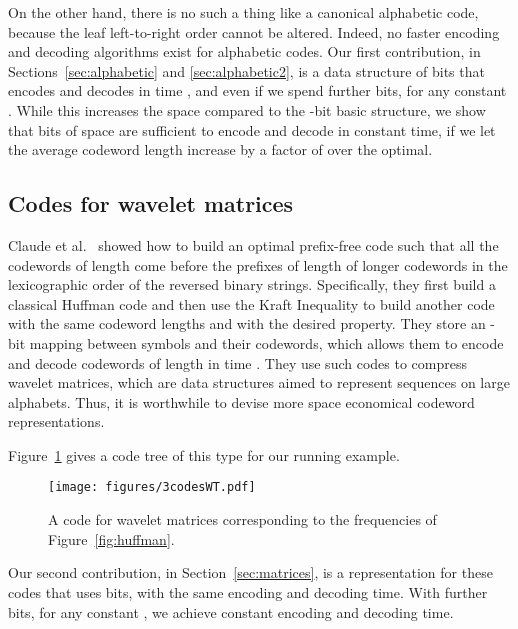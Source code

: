 \documentclass[preprint,12pt]{elsarticle}
\begin{document}
On the other hand, there is no such a thing like a canonical alphabetic code,
because the leaf left-to-right order cannot be altered. Indeed, no faster
encoding and decoding algorithms exist for alphabetic codes. Our first 
contribution, in Sections~\ref{sec:alphabetic} and \ref{sec:alphabetic2}, 
is a data structure of
 bits that encodes and decodes in time 
, and even  if we spend 
 further bits, for any constant .
While this increases the space compared to the -bit basic 
structure, we show that  bits of space are sufficient to encode
and decode in constant time, if we let the average codeword length increase
by a factor of  over the optimal.

\subsection{Codes for wavelet matrices}
\label{sec:defwm}

Claude et al.\ \cite{CNO15} showed how to build an optimal prefix-free code 
such that all the codewords of length  come before the prefixes of
length  of longer codewords in the lexicographic order of the reversed
binary strings.
Specifically, they first build a classical Huffman code and then use the 
Kraft Inequality to build another code with the same codeword lengths and 
with the desired property. They store an -bit mapping between 
symbols and their codewords, which allows them to encode and decode 
codewords of length  in time . They use such codes to 
compress wavelet matrices, which are data structures aimed to represent
sequences on large alphabets. Thus, it is worthwhile to devise more space 
economical codeword representations. 

Figure~\ref{fig:wmm} gives a code tree of this type for our running example.

\begin{figure}[t]
\begin{center}
\texttt{[image: figures/3codesWT.pdf]}
\end{center}
\vspace*{-5mm}
\caption{A code for wavelet matrices corresponding to the frequencies of 
Figure~\ref{fig:huffman}.}
\label{fig:wmm}
\end{figure}

Our second contribution, in Section~\ref{sec:matrices}, is a representation
for these codes that uses  bits, with the same  
encoding and decoding time. With  further bits, for any 
constant , we achieve constant encoding and decoding time.
\end{document}
